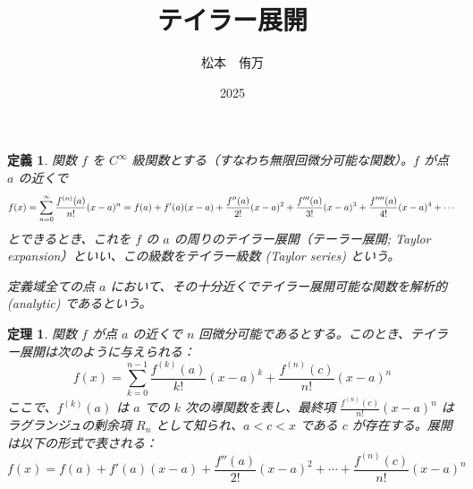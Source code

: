 \documentclass[a4paper]{article}
\newtheorem{theorem1}{定義}
\newtheorem{theorem2}{定理}
\begin{document}
    \title{テイラー展開}
    \author{松本　侑万}
    \date{2025}
    \maketitle

    \begin{tcolorbox}[
        colback=white,
        colframe=green!35!black,
        fonttitle=\bfseries,
        breakable=true]
        \begin{theorem1}
            関数 $f$ を $C^\infty$ 級関数とする（すなわち無限回微分可能な関数）。$f$ が点 $a$ の近くで
            \[
            f(x) = \sum_{n=0}^\infty \frac{f^{(n)}(a)}{n!} (x - a)^n \\
            = f(a) + f'(a)(x - a) + \frac{f''(a)}{2!}(x - a)^2 + \frac{f'''(a)}{3!}(x - a)^3 + \frac{f''''(a)}{4!}(x - a)^4 + \cdots
            \]
            とできるとき、これを $f$ の $a$ の周りのテイラー展開（テーラー展開; Taylor expansion）といい、この級数をテイラー級数 (Taylor series) という。

            定義域全ての点 $a$ において、その十分近くでテイラー展開可能な関数を解析的 (analytic) であるという。
        \end{theorem1}
    \end{tcolorbox}
    
    \begin{tcolorbox}[
        colback=white,
        colframe=green!35!black,
        fonttitle=\bfseries,
        breakable=true]
        \begin{theorem2}
            関数 $f$ が点 $a$ の近くで $n$ 回微分可能であるとする。このとき、テイラー展開は次のように与えられる：
            \[
            f(x) = \sum_{k=0}^{n-1} \frac{f^{(k)}(a)}{k!} (x-a)^k + \frac{f^{(n)}(c)}{n!} (x-a)^n
            \]
            ここで、$f^{(k)}(a)$ は $a$ での $k$ 次の導関数を表し、最終項 $\frac{f^{(n)}(c)}{n!} (x-a)^n$ はラグランジュの剰余項 $R_n$ として知られ、$a < c < x$ である $c$ が存在する。展開は以下の形式で表される：
            \[
            f(x) = f(a) + f'(a)(x-a) + \frac{f''(a)}{2!}(x-a)^2 + \cdots + \frac{f^{(n)}(c)}{n!}(x-a)^n
            \]
        \end{theorem2}
    \end{tcolorbox}
\end{document}
